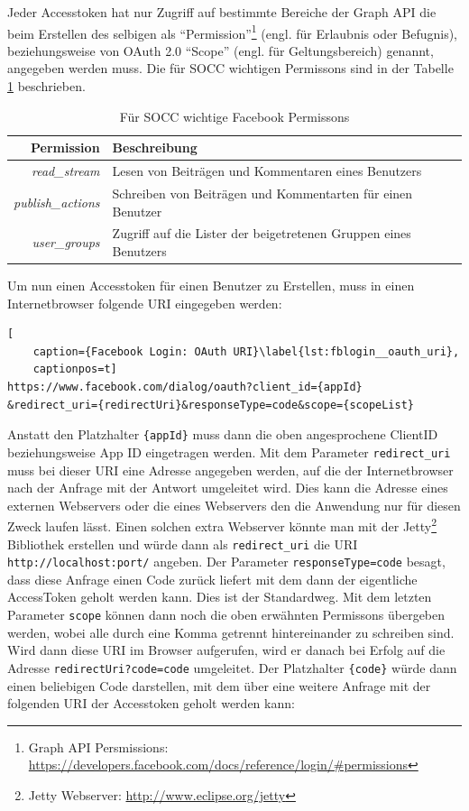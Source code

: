 Jeder Accesstoken hat nur Zugriff auf bestimmte Bereiche der Graph API die beim Erstellen des selbigen als \enquote{Permission}\footnote{Graph API Persmissions: \url{https://developers.facebook.com/docs/reference/login/\#permissions}} (engl. für Erlaubnis oder Befugnis), beziehungsweise von OAuth 2.0 \enquote{Scope} (engl. für Geltungsbereich) genannt, angegeben werden muss. Die für SOCC wichtigen Permissons sind in der Tabelle \ref{tbl:socc_facebook_persmissons} beschrieben.

\begin{table}[ht]
    \centering
    \caption{Für SOCC wichtige Facebook Permissons}
    \begin{tabular}{r|p{10cm}}
        \textbf{Permission} & 
        \textbf{Beschreibung} \\ 
        \hline
        \textit{read\_stream} & 
        Lesen von Beiträgen und Kommentaren eines Benutzers \\
        \textit{publish\_actions} & 
        Schreiben von Beiträgen und Kommentarten für einen Benutzer \\
        \textit{user\_groups} & 
        Zugriff auf die Lister der beigetretenen Gruppen eines Benutzers
    \end{tabular}
    \label{tbl:socc_facebook_persmissons}
\end{table}

Um nun einen Accesstoken für einen Benutzer zu Erstellen, muss in einen Internetbrowser folgende URI eingegeben werden:

\begin{lstlisting}[
    caption={Facebook Login: OAuth URI}\label{lst:fblogin__oauth_uri},
    captionpos=t]
https://www.facebook.com/dialog/oauth?client_id={appId}   &redirect_uri={redirectUri}&responseType=code&scope={scopeList}
\end{lstlisting}

Anstatt den Platzhalter \texttt{\{appId\}} muss dann die oben angesprochene ClientID beziehungsweise App ID eingetragen werden. Mit dem Parameter \texttt{redirect\_uri} muss bei dieser URI eine Adresse angegeben werden, auf die der Internetbrowser nach der Anfrage mit der Antwort umgeleitet wird. Dies kann die Adresse eines externen Webservers oder die eines Webservers den die Anwendung nur für diesen Zweck laufen lässt. Einen solchen extra Webserver könnte man mit der Jetty\footnote{Jetty Webserver: \url{http://www.eclipse.org/jetty}} Bibliothek erstellen und würde dann als \texttt{redirect\_uri} die URI \texttt{http://localhost:{port}/} angeben. Der Parameter \texttt{responseType=code} besagt, dass diese Anfrage einen Code zurück liefert mit dem dann der eigentliche AccessToken geholt werden kann. Dies ist der Standardweg. Mit dem letzten Parameter \texttt{scope} können dann noch die oben erwähnten Permissons übergeben werden, wobei alle durch eine Komma getrennt hintereinander zu schreiben sind. Wird dann diese URI im Browser aufgerufen, wird er danach bei Erfolg auf die Adresse \texttt{{redirectUri}?code={code}} umgeleitet. Der Platzhalter \texttt{\{code\}} würde dann einen beliebigen Code darstellen, mit dem über eine weitere Anfrage mit der folgenden URI der Accesstoken geholt werden kann:

